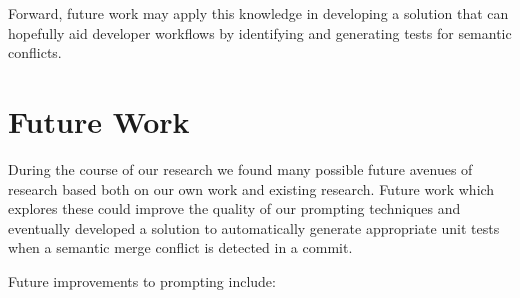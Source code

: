 Forward, future work may apply this knowledge in developing a solution that can hopefully aid developer workflows by identifying and generating tests for semantic conflicts.

\section{Future Work}

During the course of our research we found many possible future avenues of research based both on our own work and existing research. Future work which explores these could improve
the quality of our prompting techniques and eventually developed a solution to automatically generate appropriate unit tests when a semantic merge conflict is detected in a commit.

Future improvements to prompting include:
%

